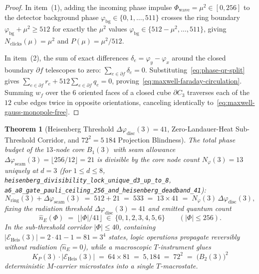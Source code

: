 \documentclass[11pt,a4paper]{article}
\theoremstyle{plain}
\newtheorem{theorem}{Theorem}[section]
\theoremstyle{definition}
\begin{document}
\begin{proof}
In item~(1), adding the incoming phase impulse $\Phi_{\mathrm{wave}} = \mu^2 \in [0, 256]$ to the detector background phase $\varphi_{\mathrm{bg}} \in \{0, 1, \dots, 511\}$ crosses the ring boundary $\varphi_{\mathrm{bg}} + \mu^2 \ge 512$ for exactly the $\mu^2$ values $\varphi_{\mathrm{bg}} \in \{512 - \mu^2, \dots, 511\}$, giving $N_{\mathrm{clicks}}(\mu) = \mu^2$ and $P(\mu) = \mu^2 / 512$.

In item~(2), the sum of exact differences $\delta_e = \varphi_y - \varphi_x$ around the closed boundary $\partial f$ telescopes to zero: $\sum_{e\in\partial f} \delta_e = 0$. Substituting~\eqref{eq:phase-qr-split} gives $\sum_{e\in\partial f} r_e + 512\sum_{e\in\partial f} q_e = 0$, proving~\eqref{eq:maxwell-faraday-circulation}. Summing $w_f$ over the $6$ oriented faces of a closed cube $\partial C_3$ traverses each of the $12$ cube edges twice in opposite orientations, canceling identically to~\eqref{eq:maxwell-gauss-monopole-free}.
\end{proof}

\begin{theorem}[Heisenberg Threshold $\Delta\varphi_{\mathrm{disc}}(3)=41$, Zero-Landauer-Heat Sub-Threshold Corridor, and $72^2=5\,184$ Projection Blindness]
\label{thm:born-heisenberg-maxwell}
The total phase budget of the $13$-node core $B_1(3)$ with seam allowance $\Delta\varphi_{\mathrm{seam}}(3) = \lfloor 256/12\rfloor = 21$ is divisible by the core node count $N_\varphi(3) = 13$ uniquely at $d = 3$ (for $1 \le d \le 8$, \texttt{heisenberg\_divisibility\_lock\_unique\_d3\_up\_to\_8}, \texttt{a6\_a8\_gate\_pauli\_ceiling\_256\_and\_heisenberg\_deadband\_41}):
\begin{equation}
  \label{eq:heisenberg-533-factorization}
  N_{\mathrm{ring}}(3) + \Delta\varphi_{\mathrm{seam}}(3) \;=\; 512 + 21 \;=\; 533 \;=\; 13 \times 41 \;=\; N_\varphi(3)\,\Delta\varphi_{\mathrm{disc}}(3),
\end{equation}
fixing the radiation threshold $\Delta\varphi_{\mathrm{disc}}(3) = 41$ and emitted quantum count
\begin{equation}
  \label{eq:heisenberg-quantum-count}
  \hat{n}_E(\Phi) \;=\; \bigl\lfloor |\Phi| / 41 \bigr\rfloor \;\in\; \{0, 1, 2, 3, 4, 5, 6\}
  \qquad (|\Phi| \le 256).
\end{equation}
In the sub-threshold corridor $|\Phi| \le 40$, containing $|\mathcal{E}_{\mathrm{Heis}}(3)| = 2\cdot 41 - 1 = 81 = 3^4$ states, logic operations propagate reversibly without radiation ($\hat{n}_E = 0$), while a macroscopic $T$-instrument glues
\begin{equation}
  \label{eq:projection-blindness-5184}
  K_P(3)\cdot |\mathcal{E}_{\mathrm{Heis}}(3)| \;=\; 64 \times 81 \;=\; 5,184 \;=\; 72^2 \;=\; \bigl(B_2(3)\bigr)^2
\end{equation}
deterministic $M$-carrier microstates into a single $T$-macrostate.
\end{theorem}
\end{document}

